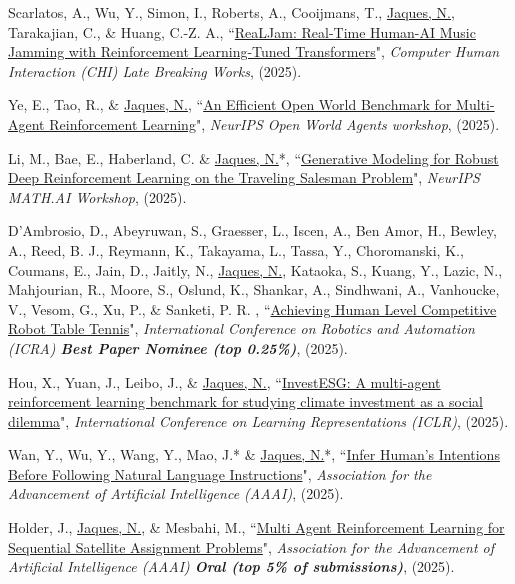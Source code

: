\documentclass[paper=letter,fontsize=11pt]{scrartcl} %
\newcommand{\PaperEntry}[6]{
		\noindent #1, ``\href{#6}{#2}", \textit{#3}, #4 (#5).}
\begin{document}
\begin{etaremune}
\item \PaperEntry{Scarlatos, A., Wu, Y., Simon, I., Roberts, A., Cooijmans, T., \underline{Jaques, N.}, Tarakajian, C., \& Huang, C.-Z. A.}{ReaLJam: Real-Time Human-AI Music Jamming with Reinforcement Learning-Tuned Transformers}{Computer Human Interaction (CHI) Late Breaking Works}{}{2025}{https://arxiv.org/abs/2502.21267}

\item \PaperEntry{Ye, E., Tao, R., \& \underline{Jaques, N.}}{An Efficient Open World Benchmark for Multi-Agent Reinforcement Learning}{NeurIPS Open World Agents workshop}{}{2025}{https://arxiv.org/abs/2508.15679}

\item \PaperEntry{Li, M., Bae, E., Haberland, C. \& \underline{Jaques, N.}*}{Generative Modeling for Robust Deep Reinforcement Learning on the Traveling Salesman Problem}{NeurIPS MATH.AI Workshop}{}{2025}{https://arxiv.org/abs/2508.08718}

\item \PaperEntry{D'Ambrosio, D., Abeyruwan, S., Graesser, L.,  Iscen, A., Ben Amor, H., Bewley, A., Reed, B. J., Reymann, K.,  Takayama, L., Tassa, Y., Choromanski, K., Coumans, E., Jain, D.,  Jaitly, N., \underline{Jaques, N.}, Kataoka, S., Kuang, Y.,  Lazic, N., Mahjourian, R., Moore, S., Oslund, K., Shankar, A.,  Sindhwani, A., Vanhoucke, V., Vesom, G., Xu, P., \& Sanketi, P. R.
}{Achieving Human Level Competitive Robot Table Tennis}{International Conference on Robotics and Automation (ICRA) \textbf{Best Paper Nominee (top 0.25\%)}}{}{2025}{https://arxiv.org/abs/2408.03906}

\item \PaperEntry{Hou, X., Yuan, J., Leibo, J., \& \underline{Jaques, N.}}{InvestESG: A multi-agent reinforcement learning benchmark for studying climate investment as a social dilemma}{International Conference on Learning Representations (ICLR)}{}{2025}{https://arxiv.org/abs/2411.09856}

\item \PaperEntry{Wan, Y., Wu, Y., Wang, Y., Mao, J.* \& \underline{Jaques, N.}*}{Infer Human’s Intentions Before Following
Natural Language Instructions}{Association for the Advancement of Artificial Intelligence (AAAI)}{}{2025}{https://arxiv.org/abs/2409.18073}


\item \PaperEntry{Holder, J., \underline{Jaques, N.}, \& Mesbahi, M.}{Multi Agent Reinforcement Learning for Sequential
Satellite Assignment Problems}{Association for the Advancement of Artificial Intelligence (AAAI) \textbf{Oral (top 5\% of submissions)}}{}{2025}{https://arxiv.org/abs/2412.15573}


\end{etaremune}
\end{document}
